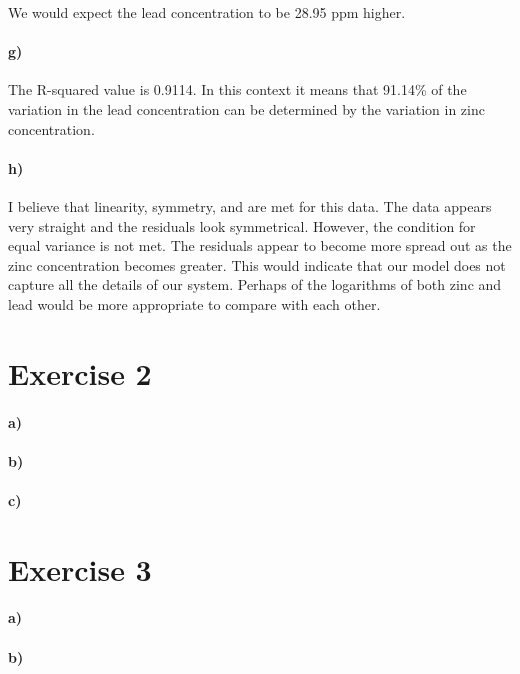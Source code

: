 \documentclass[12pt]{article}
\begin{document}
We would expect the lead concentration to be 28.95 ppm higher.

\paragraph{g)}

The R-squared value is 0.9114. In this context it means that 91.14\% of
the variation in the lead concentration can be determined by the variation in zinc
concentration.

\paragraph{h)}

I believe that linearity, symmetry, and are met for this data. The data appears
very straight and the residuals look symmetrical. However,
the condition for equal variance is not met. The residuals appear to become
more spread out as the zinc concentration becomes greater. This would indicate
that our model does not capture all the details of our system. Perhaps of the
logarithms of both zinc and lead would be more appropriate to compare with each other.

\section*{Exercise 2}

\paragraph{a)}

\paragraph{b)}

\paragraph{c)}

\section*{Exercise 3}

\paragraph{a)}

\paragraph{b)}
\end{document}
